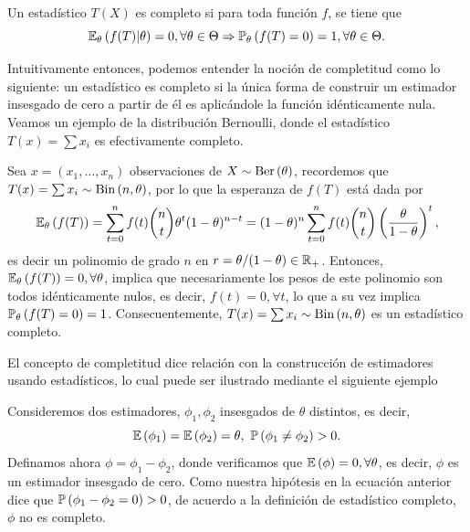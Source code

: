 \begin{definition}
	Un estadístico $T(X)$ es completo si para toda función $f$, se tiene que 
	\begin{equation}
		\mathbb{E}_\theta \left(f(T)|\theta\right) = 0, \forall \theta\in\Theta \Rightarrow \mathbb{P}_\theta \left(f(T)=0\right) = 1, \forall \theta\in\Theta.
	\end{equation}
	
\end{definition}



Intuitivamente entonces, podemos entender la noción de completitud como lo siguiente: un estadístico es completo si la única forma de construir un estimador insesgado de cero a partir de él es aplicándole la función idénticamente nula.  Veamos un ejemplo de la distribución Bernoulli, donde el estadístico $T(x) = \sum x_i$ es efectivamente completo. 

\begin{example}
	\label{eq:est_completo_bernoulli}
	Sea $x=(x_1,\ldots,x_n)$ observaciones de $X\sim\text{Ber}\left(\theta\right)$, recordemos que $T(x) = \sum x_i\sim\text{Bin}\left(n,\theta\right)$, por lo que la esperanza de $f(T)$ está dada por
	\begin{equation}
		\mathbb{E}_\theta \left(f(T)\right) = \sum_{t=0}^n f(t)\binom{n}{t}\theta^t(1-\theta)^{n-t}= (1-\theta)^n\sum_{t=0}^n f(t)\binom{n}{t}\left(\frac{\theta}{1-\theta}\right)^t,
	\end{equation}
	es decir un polinomio de grado $n$ en $r=\theta/(1-\theta)\in{\mathbb R}_+$. Entonces, $\mathbb{E}_\theta \left(f(T)\right) = 0,\forall\theta$, implica que necesariamente los pesos de este polinomio son todos idénticamente nulos, es decir, $f(t)=0,\forall t$, lo que a su vez implica $\mathbb{P}_\theta \left(f(T)=0\right) = 1$. Consecuentemente, $T(x) = \sum x_i\sim\text{Bin}\left(n,\theta\right)$ es un estadístico completo.
\end{example}

El concepto de completitud dice relación con la construcción de estimadores usando estadísticos, lo cual puede ser ilustrado mediante el siguiente ejemplo

\begin{example}
	Consideremos dos estimadores, $\phi_1, \phi_2$ insesgados de $\theta$ distintos, es decir, 
	\begin{equation}
	\mathbb{E} \left(\phi_1\right) = \mathbb{E} \left(\phi_2\right) = \theta, \ \mathbb{P} \left(\phi_1\neq \phi_2\right) > 0.
	\end{equation}
	Definamos ahora $\phi = \phi_1 - \phi_2$, donde verificamos que $\mathbb{E} \left(\phi\right) = 0, \forall \theta$, es decir, $\phi$ es un estimador insesgado de cero. Como nuestra hipótesis en la ecuación anterior dice que $\mathbb{P} \left(\phi_1 - \phi_2=0\right)>0$, de acuerdo a la definición  de estadístico completo, $\phi$ no es completo. 
\end{example}


